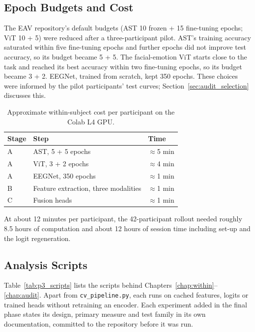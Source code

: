 \subsection{Epoch Budgets and Cost}
\label{sec:epoch_budget}
The EAV repository's default budgets (AST 10 frozen + 15 fine-tuning epochs; ViT 10 + 5) were reduced after a three-participant pilot. AST's training accuracy saturated within five fine-tuning epochs and further epochs did not improve test accuracy, so its budget became 5 + 5. The facial-emotion ViT starts close to the task and reached its best accuracy within two fine-tuning epochs, so its budget became 3 + 2. EEGNet, trained from scratch, kept 350 epochs. These choices were informed by the pilot participants' test curves; Section~\ref{sec:audit_selection} discusses this.

\begin{table}[htbp]
\centering
\small
\caption{Approximate within-subject cost per participant on the Colab L4 GPU.}
\label{tab:training_times}
\begin{tabular}{p{3.4cm} p{6.6cm} p{3.3cm}}
\hline
\textbf{Stage} & \textbf{Step} & \textbf{Time} \\
\hline
A & AST, 5 + 5 epochs & $\approx$5 min \\
A & ViT, 3 + 2 epochs & $\approx$4 min \\
A & EEGNet, 350 epochs & $\approx$1 min \\
B & Feature extraction, three modalities & $\approx$1 min \\
C & Fusion heads & $\approx$1 min \\
\hline
\end{tabular}
\end{table}

At about 12 minutes per participant, the 42-participant rollout needed roughly 8.5 hours of computation and about 12 hours of session time including set-up and the logit regeneration.

\subsection{Analysis Scripts}
\label{sec:p3_scripts}
Table~\ref{tab:p3_scripts} lists the scripts behind Chapters~\ref{chap:within}--\ref{chap:audit}. Apart from \texttt{cv\_pipeline.py}, each runs on cached features, logits or trained heads without retraining an encoder. Each experiment added in the final phase states its design, primary measure and test family in its own documentation, committed to the repository before it was run.

